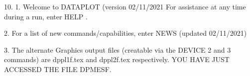 10.
1. Welcome to DATAPLOT (version 02/11/2021  For assistance at
   any time during a run, enter HELP   .

2. For a list of new commands/capabilities,
   enter NEWS  (updated 02/11/2021)

3. The alternate Graphics output files (creatable
   via the DEVICE 2 and 3 commands) are
   dppl1f.tex and dppl2f.tex respectively.
YOU HAVE JUST ACCESSED THE FILE DPMESF.
